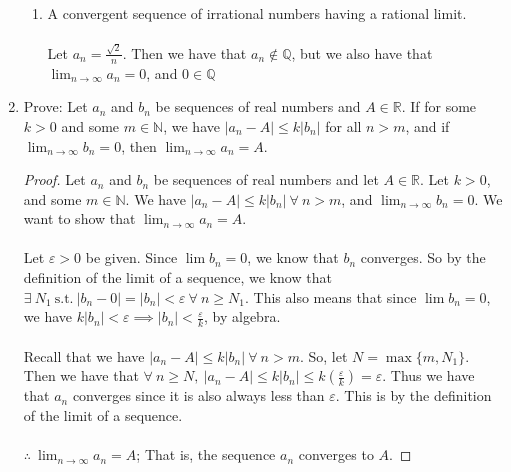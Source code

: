 \documentclass[12pt,letterpaper]{article}
\newcommand{\st}{\ \text{s.t.}\ }
\newcommand{\abs}[1]{\left\lvert #1 \right\rvert}
\newcommand{\R}{\mathbb{R}}
\newcommand{\N}{\mathbb{N}}
\theoremstyle{case}
\begin{document}
\begin{enumerate}
\begin{enumerate}
		\item A convergent sequence of irrational numbers having a rational limit.
		\\\\Let $a_n=\frac{\sqrt{2}}{n}$. Then we have that $a_n \notin \mathbb{Q}$, but we also have that $\lim_{n\to\infty} a_n = 0$, and $0 \in \mathbb{Q}$
	\end{enumerate}
	\item Prove: Let $a_n$ and $b_n$ be sequences of real numbers and $A \in \mathbb{R}$. If for some $k > 0$ and some $m \in \mathbb{N}$, we have $|a_n-A|\leq k|b_n|$ for all $n > m$, and if $\lim_{n\to\infty} b_n = 0$, then $\lim_{n\to\infty} a_n = A$.
	\begin{proof}
		Let $a_n$ and $b_n$ be sequences of real numbers and let $A \in \R$. Let $k >0$, and some $m \in \N$. We have $\abs{a_n-A}\leq k|b_n|\ \forall\ n > m$, and $\lim_{n\to\infty} b_n = 0$. We want to show that $\lim_{n\to\infty} a_n = A$. 
		\\\\Let $\varepsilon>0$ be given. Since $\lim b_n=0$, we know that $b_n$ converges. So by the definition of the limit of a sequence, we know that $\exists\ N_1 \st |b_n-0| =|b_n| < \varepsilon\ \forall\ n \geq N_1$. This also means that since $\lim b_n = 0$, we have $k|b_n| < \varepsilon \implies |b_n| < \frac{\varepsilon}{k}$, by algebra.
		\\\\Recall that we have $|a_n-A|\leq k|b_n|\ \forall\ n > m$. So, let $N=\max \{m,N_1\}$. Then we have that $\forall\ n \geq N,\ |a_n-A|\leq k|b_n| \leq k\left(\frac{\varepsilon}{k}\right)=\varepsilon$. Thus we have that $a_n$ converges since it is also always less than $\varepsilon$. This is by the definition of the limit of a sequence.
		\\\\$\therefore\ \lim_{n\to\infty} a_n = A$; That is, the sequence $a_n$ converges to $A$.
	\end{proof}
	

\end{enumerate}
\end{document}
